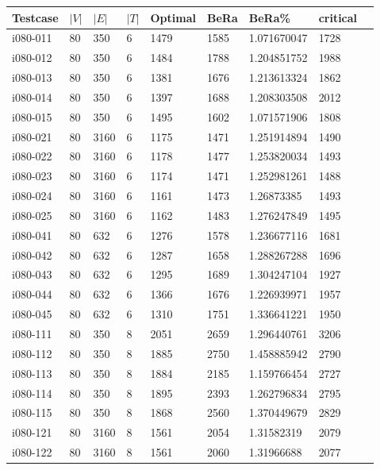 \begin{appendices}
\begin{longtable}[htbp]{l l l l l l l l l}
Testcase	&	$|V|$	&	$|E|$	&	$|T|$	&	Optimal	&	BeRa	&	BeRa\%	&	critical \\ \hline
\endhead
 i080-011	&	80 	&	350 	&	6 	&	1479	&	1585	&	1.071670047	&	1728	\\
 i080-012	&	80 	&	350 	&	6 	&	1484	&	1788	&	1.204851752	&	1988	\\
 i080-013	&	80 	&	350 	&	6 	&	1381	&	1676	&	1.213613324	&	1862	\\
 i080-014	&	80 	&	350 	&	6 	&	1397	&	1688	&	1.208303508	&	2012	\\
 i080-015	&	80 	&	350 	&	6 	&	1495	&	1602	&	1.071571906	&	1808	\\
\hline
 i080-021	&	80 	&	3160 	&	6 	&	1175	&	1471	&	1.251914894	&	1490	\\
 i080-022	&	80 	&	3160 	&	6 	&	1178	&	1477	&	1.253820034	&	1493	\\
 i080-023	&	80 	&	3160 	&	6 	&	1174	&	1471	&	1.252981261	&	1488	\\
 i080-024	&	80 	&	3160 	&	6 	&	1161	&	1473	&	1.26873385	&	1493	\\
 i080-025	&	80 	&	3160 	&	6 	&	1162	&	1483	&	1.276247849	&	1495	\\
\hline
 i080-041	&	80 	&	632 	&	6 	&	1276	&	1578	&	1.236677116	&	1681	\\
 i080-042	&	80 	&	632 	&	6 	&	1287	&	1658	&	1.288267288	&	1696	\\
 i080-043	&	80 	&	632 	&	6 	&	1295	&	1689	&	1.304247104	&	1927	\\
 i080-044	&	80 	&	632 	&	6 	&	1366	&	1676	&	1.226939971	&	1957	\\
 i080-045	&	80 	&	632 	&	6 	&	1310	&	1751	&	1.336641221	&	1950	\\
\hline
 i080-111	&	80 	&	350 	&	8 	&	2051	&	2659	&	1.296440761	&	3206	\\
 i080-112	&	80 	&	350 	&	8 	&	1885	&	2750	&	1.458885942	&	2790	\\
 i080-113	&	80 	&	350 	&	8 	&	1884	&	2185	&	1.159766454	&	2727	\\
 i080-114	&	80 	&	350 	&	8 	&	1895	&	2393	&	1.262796834	&	2795	\\
 i080-115	&	80 	&	350 	&	8 	&	1868	&	2560	&	1.370449679	&	2829	\\
\hline
 i080-121	&	80 	&	3160 	&	8 	&	1561	&	2054	&	1.31582319	&	2079	\\
 i080-122	&	80 	&	3160 	&	8 	&	1561	&	2060	&	1.31966688	&	2077	\\

\end{longtable}
\end{appendices}
